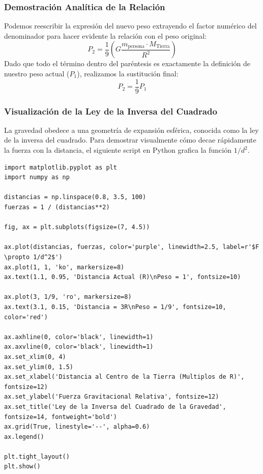 \documentclass[12pt]{article}
\begin{document}
\subsubsection*{Demostración Analítica de la Relación}
Podemos reescribir la expresión del nuevo peso extrayendo el factor numérico del denominador para hacer evidente la relación con el peso original:
\begin{equation}
    P_2 = \frac{1}{9} \left( G \frac{m_{\text{persona}} \cdot M_{\text{Tierra}}}{R^2} \right)
\end{equation}
Dado que todo el término dentro del paréntesis es exactamente la definición de nuestro peso actual ($P_1$), realizamos la sustitución final:
\begin{equation}
    P_2 = \frac{1}{9} P_1
\end{equation}

\subsubsection*{Visualización de la Ley de la Inversa del Cuadrado}
La gravedad obedece a una geometría de expansión esférica, conocida como la ley de la inversa del cuadrado. Para demostrar visualmente cómo decae rápidamente la fuerza con la distancia, el siguiente script en Python grafica la función $1/d^2$.

\begin{lstlisting}
import matplotlib.pyplot as plt
import numpy as np

distancias = np.linspace(0.8, 3.5, 100)
fuerzas = 1 / (distancias**2)

fig, ax = plt.subplots(figsize=(7, 4.5))

ax.plot(distancias, fuerzas, color='purple', linewidth=2.5, label=r'$F \propto 1/d^2$')
ax.plot(1, 1, 'ko', markersize=8)
ax.text(1.1, 0.95, 'Distancia Actual (R)\nPeso = 1', fontsize=10)

ax.plot(3, 1/9, 'ro', markersize=8)
ax.text(3.1, 0.15, 'Distancia = 3R\nPeso = 1/9', fontsize=10, color='red')

ax.axhline(0, color='black', linewidth=1)
ax.axvline(0, color='black', linewidth=1)
ax.set_xlim(0, 4)
ax.set_ylim(0, 1.5)
ax.set_xlabel('Distancia al Centro de la Tierra (Multiplos de R)', fontsize=12)
ax.set_ylabel('Fuerza Gravitacional Relativa', fontsize=12)
ax.set_title('Ley de la Inversa del Cuadrado de la Gravedad', fontsize=14, fontweight='bold')
ax.grid(True, linestyle='--', alpha=0.6)
ax.legend()

plt.tight_layout()
plt.show()
\end{lstlisting}
\end{document}
